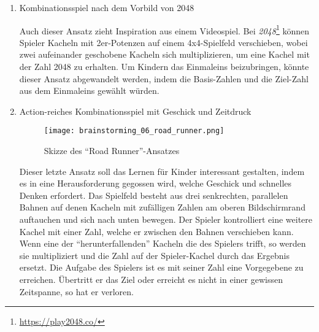 \begin{enumerate}
  Dieser Ansatz ist inspiriert durch das Videospiel \emph{Dorfromantik}\footnote{\url{https://toukana.com/dorfromantik/}}, in dem verschiedene hexagonale Landschafts-Kacheln auf einem Spielbrett derart angebracht werden müssen, dass sie Synergie-Effekte erzielen.
  Wenn sich das Spielprinzip so anpassen ließe, dass eine Spielerin Kacheln mit verschiedenen Zahlen so platzieren muss, dass bei der Multiplikation von aneinanderliegenden Kacheln bestimmte Ergebnisse erzielt werden---ähnlich einem Sudoku---so könnte dies eine für Kinder anregende Lernmechanik darstellen.

  \item Kombinationsspiel nach dem Vorbild von 2048
  
  Auch dieser Ansatz zieht Inspiration aus einem Videospiel. Bei \emph{2048}\footnote{\url{https://play2048.co/}} können Spieler Kacheln mit 2er-Potenzen auf einem 4x4-Spielfeld verschieben, wobei zwei aufeinander geschobene Kacheln sich multiplizieren, um eine Kachel mit der Zahl 2048 zu erhalten.
  Um Kindern das Einmaleins beizubringen, könnte dieser Ansatz abgewandelt werden, indem die Basis-Zahlen und die Ziel-Zahl aus dem Einmaleins gewählt würden.

  \item Action-reiches Kombinationsspiel mit Geschick und Zeitdruck
  
  \begin{figure}[h]
    \centering
    \texttt{[image: brainstorming\_06\_road\_runner.png]}
    \caption{Skizze des \enquote{Road Runner}-Ansatzes}
  \end{figure}

  Dieser letzte Ansatz soll das Lernen für Kinder interessant gestalten, indem es in eine Herausforderung gegossen wird, welche Geschick und schnelles Denken erfordert.
  Das Spielfeld besteht aus drei senkrechten, parallelen Bahnen auf denen Kacheln mit zufälligen Zahlen am oberen Bildschirmrand auftauchen und sich nach unten bewegen.
  Der Spieler kontrolliert eine weitere Kachel mit einer Zahl, welche er zwischen den Bahnen verschieben kann.
  Wenn eine der \enquote{herunterfallenden} Kacheln die des Spielers trifft, so werden sie multipliziert und die Zahl auf der Spieler-Kachel durch das Ergebnis ersetzt.
  Die Aufgabe des Spielers ist es mit seiner Zahl eine Vorgegebene zu erreichen.
  Übertritt er das Ziel oder erreicht es nicht in einer gewissen Zeitspanne, so hat er verloren. 

\end{enumerate}

